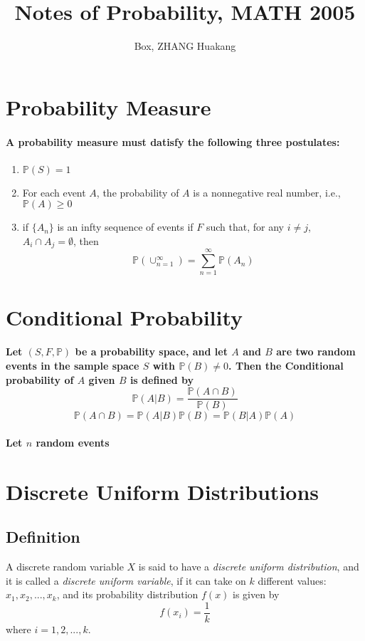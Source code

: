 \documentclass[titlepage]{article}
\title{Notes of Probability, MATH 2005}
\author{Box, ZHANG Huakang}
\begin{document}
    \maketitle
    \tableofcontents
    \section{Probability Measure}
        \paragraph{
            A probability measure must datisfy the following three postulates:
        }
        \begin{enumerate}
            \item $\mathbb{P}(S)=1$
            \item For each event $A$, the probability of $A$ is a nonnegative real number, i.e., $\mathbb{P}(A)\geq 0$
            \item if $\{A_n\}$ is an infty sequence of events if $F$ such that, for any $i\neq j$, $A_i\cap A_j=\emptyset$, then $$\mathbb{P}(\cup_{n=1}^\infty)=\sum_{n=1}^\infty\mathbb{P}(A_n)$$
        \end{enumerate}
    \section{Conditional Probability}
        \paragraph{
            Let $(S,F,\mathbb{P})$ be a probability space, and let $A$ and $B$ are two random events in the sample space $S$ with $\mathbb{P}(B)\neq 0$. Then the Conditional probability of $A$ given $B$ is defined by 
            $$\mathbb{P}(A|B)=\frac{\mathbb{P}(A\cap B)}{\mathbb{P}(B)}$$
            $$\mathbb{P}(A\cap B)=\mathbb{P}(A|B)\mathbb{P}(B)=\mathbb{P}(B|A)\mathbb{P}(A)$$
        }
        \paragraph{
            Let $n$ random events
        }
    \section{Discrete Uniform Distributions}
        \subsection*{Definition}
            A discrete random variable $X$ is said to have a \textit{discrete uniform distribution}, and it is called a \textit{discrete uniform variable}, if it can take on $k$ different values: $x_1,x_2,...,x_k$, and its probability distribution $f(x)$ is given by
            $$f(x_i)=\frac{1}{k}$$
            where $i=1,2,...,k$.
\end{document}
